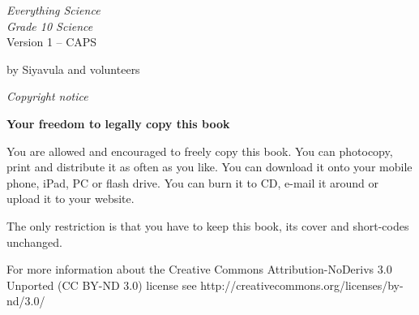 
\begin{titlepage}
\begin{adjustwidth}{1in}{1in}
\begin{center}
    \thispagestyle{empty}

    \vspace*{4in}

    {
    {\normalfont\sffamily\fontsize{36}\normalfont\itshape{Everything Science} \\ \vspace*{1cm}
     \normalfont\sffamily\fontsize{22}\normalfont\itshape{Grade 10 Science}}
    \vspace*{1in} \\
    \LARGE Version 1 -- CAPS \\

   {\vspace*{2in}
     by Siyavula and volunteers 
  

\vfill

    }}
\end{center}
\end{adjustwidth}
\end{titlepage}






\newpage
\thispagestyle{empty}
\begin{center}
\normalfont\sffamily\fontsize{22}\normalfont\itshape Copyright notice\\

\vspace*{1in}

\textbf{Your freedom to legally copy this book}\\

\end{center}


{\LARGE
You are allowed and encouraged to freely copy this book. You can photocopy, print and distribute it as
often as you like. You can download it onto your mobile phone, iPad, PC or flash drive. You can burn it
to CD, e-mail it around or upload it to your website. \par

The only restriction is that you have to keep this book, its cover and short-codes unchanged.\par

For more information about the Creative Commons Attribution-NoDerivs 3.0 Unported (CC BY-ND
3.0) license see http://creativecommons.org/licenses/by-nd/3.0/}\\


